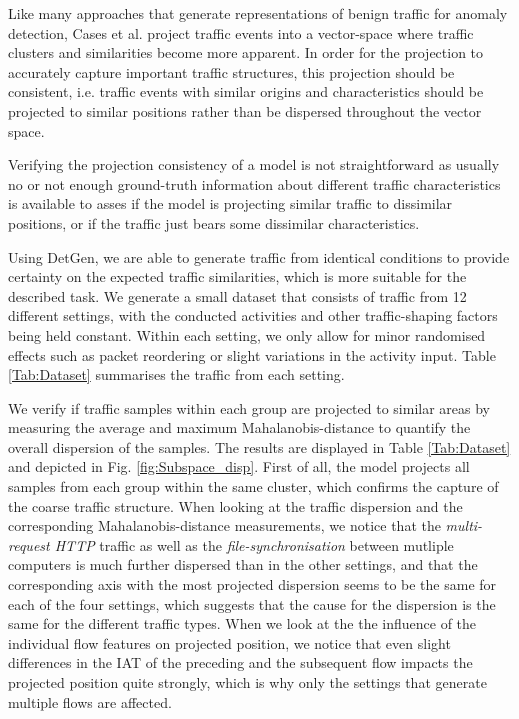 \documentclass[conference]{IEEEtran}
\begin{document}
Like many approaches that generate representations of benign traffic for anomaly detection, Cases et al. project traffic events into a vector-space where traffic clusters and similarities become more apparent. In order for the projection to accurately capture important traffic structures, this projection should be consistent, i.e. traffic events with similar origins and characteristics should be projected to similar positions rather than be dispersed throughout the vector space. 

Verifying the projection consistency of a model is not straightforward as usually no or not enough ground-truth information about different traffic characteristics is available to asses if the model is projecting similar traffic to dissimilar positions, or if the traffic just bears some dissimilar characteristics.

Using DetGen, we are able to generate traffic from identical conditions to provide certainty on the expected traffic similarities, which is more suitable for the described task. We generate a small dataset that consists of traffic from 12 different settings, with the conducted activities and other traffic-shaping factors being held constant. Within each setting, we only allow for minor randomised effects such as packet reordering or slight variations in the activity input. Table \ref{Tab:Dataset} summarises the traffic from each setting. 


We verify if traffic samples within each group are projected to similar areas by measuring the average and maximum Mahalanobis-distance to quantify the overall dispersion of the samples. The results are displayed in Table \ref{Tab:Dataset} and depicted in Fig. \ref{fig:Subspace_disp}. First of all, the model projects all samples from each group within the same cluster, which confirms the capture of the coarse traffic structure. When looking at the traffic dispersion and the corresponding Mahalanobis-distance measurements, we notice that the \textit{multi-request HTTP} traffic as well as the \textit{file-synchronisation} between mutliple computers is much further dispersed than in the other settings, and that the corresponding axis with the most projected dispersion seems to be the same for each of the four settings, which suggests that the cause for the dispersion is the same for the different traffic types. When we look at the the influence of the individual flow features on projected position, we notice that even slight differences in the IAT of the preceding and the subsequent flow impacts the projected position quite strongly, which is why only the settings that generate multiple flows are affected.
\end{document}
